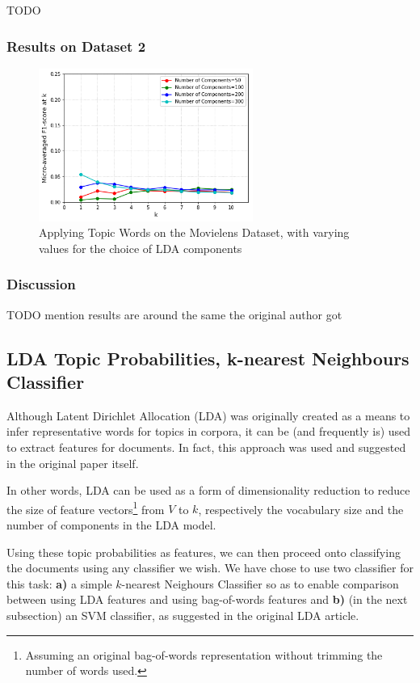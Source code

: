 {\color{red} TODO}

\subsubsection{Results on Dataset 2}

\begin{figure}[H]
    \centering
    \includegraphics[width=7cm]{chapters/05_experiments/images/movielens-topic-words.png}
    \caption{Applying Topic Words on the Movielens Dataset, with varying values for the choice of LDA components}
    \label{fig:ovr_svm_movielens}
\end{figure}

\subsubsection{Discussion}

{\color{red} TODO mention results are around the same the original author got}

\subsection{LDA Topic Probabilities, k-nearest Neighbours Classifier}\label{sub:lda_topics}

Although Latent Dirichlet Allocation (LDA) \citep{blei_etal_2003} was originally created as a means to infer representative words for topics in corpora, it can be (and frequently is) used to extract features for documents. In fact, this approach was used and suggested in the original paper itself.

In other words, LDA can be used as a form of dimensionality reduction to reduce the size of feature vectors\footnote{Assuming an original bag-of-words representation without trimming the number of words used.} from $V$ to $k$, respectively the vocabulary size and the number of components in the LDA model.

Using these topic probabilities as features, we can then proceed onto classifying the documents using any classifier we wish. We have chose to use two classifier for this task: \textbf{a)} a simple $k$-nearest Neighours Classifier so as to enable comparison between using LDA features and using bag-of-words features and \textbf{b)} (in the next subsection) an SVM classifier, as suggested in the original LDA article.


